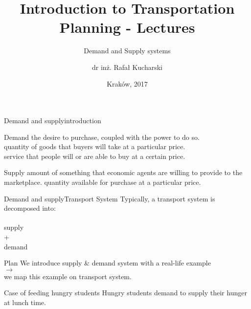 \documentclass{beamer}
\title[Demand and Supply systems] %
{Introduction to Transportation Planning - Lectures}
\subtitle
{Demand and Supply systems}
\author[dr in\.z. Rafa\l{} Kucharski] %
{dr in\.z. Rafa\l{} Kucharski\inst{1}}
\institute[] %
{
  \inst{1}%
  Katedra System\'{o}w Transportowych\\
  Politechnika Krakowska
 }
\date[KST, L-2, WIL, PK] %
{Krak\'{o}w, 2017}
\begin{document}
\begin{frame}
  \titlepage
\end{frame}

\begin{frame}{Demand and supply}{introduction}

\begin{block}{Demand} the desire to purchase, coupled with the power to do so. \\
quantity of goods that buyers will take at a particular price. \\ service that people will or are able to buy at a certain price.
\end{block}
\begin{block}{Supply} amount of something that economic agents are willing to provide to the marketplace. 
 quantity available for purchase at a particular price.
\end{block}
\end{frame}

\begin{frame}{Demand and supply}{Transport System}
Typically, a transport system is decomposed into:\\~\\
 \alert{supply} \\ + \\  \alert{demand}
\end{frame}

\begin{frame}{Plan}
We introduce supply \& demand system with a real-life example \\ $\rightarrow$ \\ we map this example on transport system.
\end{frame}


\begin{frame}{Case of feeding hungry students}
Hungry students \alert{demand} to \alert{supply} their hunger at lunch time.
\end{frame}
\end{document}
